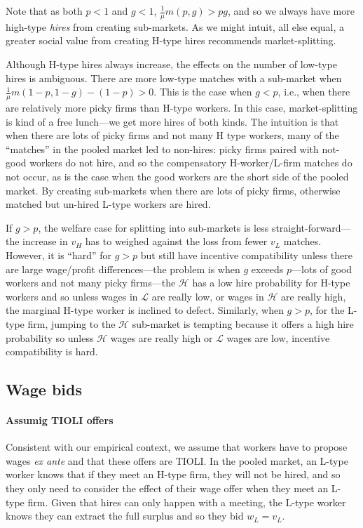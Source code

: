\documentclass[12pt]{article}
\newcommand{\Lsm}{$\mathcal{L}$}
\newcommand{\Hsm}{$\mathcal{H}$}
\begin{document}
Note that as both $p < 1$ and $g < 1$, $\frac{1}{\mu} m(p,g) > pg$, and so we always have more high-type \emph{hires} from creating sub-markets. 
As we might intuit, all else equal, a greater social value from creating H-type hires recommends market-splitting. 

Although H-type hires always increase, the effects on the number of low-type hires is ambiguous. 
There are more low-type matches with a sub-market when $\frac{1}{\mu} m(1 - p, 1 - g) - (1 - p) > 0$.
This is the case when $g < p$, i.e., when there are relatively more picky firms than H-type workers.
In this case, market-splitting is kind of a free lunch---we get more hires of both kinds. 
The intuition is that when there are lots of picky firms and not many H type workers, many of the ``matches'' in the pooled market led to non-hires: picky firms paired with not-good workers do not hire, and so the compensatory H-worker/L-firm matches do not occur, as is the case when the good workers are the short side of the pooled market.  
By creating sub-markets when there are lots of picky firms, otherwise matched but un-hired L-type workers are hired. 

If $g > p$, the welfare case for splitting into sub-markets is less straight-forward---the increase in $v_H$ has to weighed against the loss from fewer $v_L$ matches.
However, it is ``hard'' for $g > p$ but still have incentive compatibility unless there are large wage/profit differences---the problem is when $g$ exceeds $p$---lots of good workers and not many picky firms---the \Hsm{} has a low hire probability for H-type workers and so unless wages in \Lsm{} are really low, or wages in \Hsm{} are really high, the marginal H-type worker is inclined to defect.
Similarly, when $g > p$, for the L-type firm, jumping to the \Hsm{} sub-market is tempting because it offers a high hire probability so unless \Hsm{} wages are really high or \Lsm{} wages are low, incentive compatibility is hard.  

\subsection{Wage bids}

\paragraph{Assumig TIOLI offers} 
Consistent with our empirical context, we assume that workers have to propose wages \emph{ex ante} and that these offers are TIOLI.
In the pooled market, an L-type worker knows that if they meet an H-type firm, they will not be hired, and so they only need to consider the effect of their wage offer when they meet an L-type firm.
Given that hires can only happen with a meeting, the L-type worker knows they can extract the full surplus and so they bid $w_L = v_L$.
\end{document}

